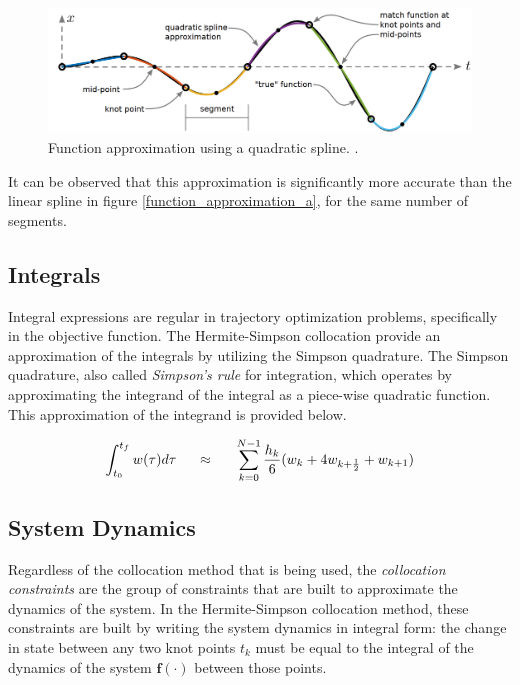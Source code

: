 \documentclass{thesisreport}
\begin{document}
 \begin{figure}[h]
 \centering
 \includegraphics[width=\textwidth]{Images/Trajectory/Function_approximation_b}
 \caption{Function approximation using a quadratic spline.  \cite{Kelly2017}.}
 \label{function_approximation_b}
 \end{figure} 
 
It can be observed that this approximation is significantly more accurate than the linear spline in figure \ref{function_approximation_a}, for the same number of segments.
 
 
 
 \subsection{Integrals}
 
 Integral expressions are regular in trajectory optimization problems, specifically in the objective function. The Hermite-Simpson collocation provide an approximation of the integrals by utilizing the Simpson quadrature. The Simpson quadrature, also called \textit{Simpson's rule} for integration, which operates by approximating the integrand of the integral as a piece-wise quadratic function. This approximation of the integrand is provided below. 
 
\begin{equation*}
\int_{t_0}^{t_f} w(\tau) d \tau \text{\hspace{0.5cm}}  \approx \text{\hspace{0.5cm}}  \sum\limits_{k=0}^{N-1} \frac{h_k}{6} ( w_k + 4 w_{k + \frac{1}{2}} + w_{k+1})
\end{equation*}  
  
  
\subsection{System Dynamics}

Regardless of the collocation method that is being used, the \textit{collocation constraints} are the group of constraints that are built to approximate the dynamics of the system. In the Hermite-Simpson collocation method, these constraints are built by writing the system dynamics in integral form: the change in state between any two knot points $t_k$ must be equal to the integral of the dynamics of the system $\bm{f}(\cdot)$ between those points.
  
\end{document}
